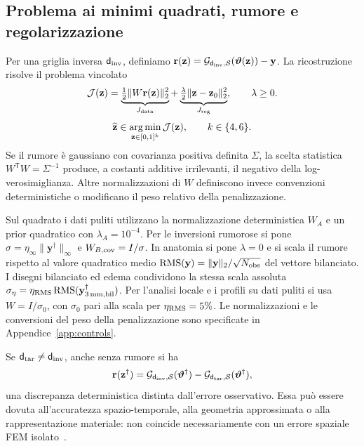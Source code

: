 \subsection{Problema ai minimi quadrati, rumore e regolarizzazione}

Per una griglia inversa $\mathsf d_{\rm inv}$, definiamo $\mathbf r(\mathbf z)=\mathcal{G}_{\mathsf d_{\rm inv},\mathcal S}(\boldsymbol\vartheta(\mathbf z))-\mathbf y$. La ricostruzione risolve il problema vincolato
\begin{equation}
 \mathcal{J}(\mathbf z)=
 \underbrace{\tfrac12\|W\mathbf r(\mathbf z)\|_2^2}_{J_{\rm data}}
 +\underbrace{\tfrac\lambda2\|\mathbf z-\mathbf z_0\|_2^2}_{J_{\rm reg}},
 \qquad \lambda\ge0 .
 \label{eq:objective}
\end{equation}
\begin{equation}
 \widehat{\mathbf z}\in\operatorname*{arg\,min}_{\mathbf z\in[0,1]^k}
 \mathcal{J}(\mathbf z),\qquad k\in\{4,6\}.
 \label{eq:inverse-min}
\end{equation}
Se il rumore è gaussiano con covarianza positiva definita $\Sigma$, la scelta statistica $W^{\mathsf T}W=\Sigma^{-1}$ produce, a costanti additive irrilevanti, il negativo della log-verosimiglianza. Altre normalizzazioni di $W$ definiscono invece convenzioni deterministiche o modificano il peso relativo della penalizzazione.

Sul quadrato i dati puliti utilizzano la normalizzazione deterministica $W_A$ e un prior quadratico con $\lambda_A=10^{-4}$. Per le inversioni rumorose si pone $\sigma=\eta_\infty\|\mathbf y^\dagger\|_\infty$ e $W_{B,\rm cov}=I/\sigma$. In anatomia si pone $\lambda=0$ e si scala il rumore rispetto al valore quadratico medio $\operatorname{RMS}(\mathbf y)=\|\mathbf y\|_2/\sqrt{N_{\rm obs}}$ del vettore bilanciato. I disegni bilanciato ed edema condividono la stessa scala assoluta $\sigma_\eta=\eta_{\rm RMS}\operatorname{RMS}(\mathbf y^\dagger_{3\,\mathrm{mm},\rm bil})$. Per l'analisi locale e i profili su dati puliti si usa $W=I/\sigma_0$, con $\sigma_0$ pari alla scala per $\eta_{\rm RMS}=5\%$. Le normalizzazioni e le conversioni del peso della penalizzazione sono specificate in Appendice~\ref{app:controls}.

Se $\mathsf d_{\rm tar}\ne\mathsf d_{\rm inv}$, anche senza rumore si ha
\begin{equation}
 \mathbf r(\mathbf z^\dagger)
 =\mathcal{G}_{\mathsf d_{\rm inv},\mathcal S}(\boldsymbol\vartheta^\dagger)
  -\mathcal{G}_{\mathsf d_{\rm tar},\mathcal S}(\boldsymbol\vartheta^\dagger),
 \label{eq:inverse-model-discrepancy}
\end{equation}
una discrepanza deterministica distinta dall'errore osservativo. Essa può essere dovuta all'accuratezza spazio-temporale, alla geometria approssimata o alla rappresentazione materiale: non coincide necessariamente con un errore spaziale FEM isolato~\citep{kaipio2007discretization}.

